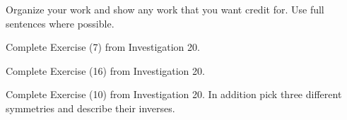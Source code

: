 \documentclass[addpoints]{exam}
\begin{document}
Organize your work and show any work that you want credit for. Use full sentences where possible.

\begin{questions}
\question 
Complete Exercise (7) from Investigation 20.

\question 
Complete Exercise (16) from Investigation 20.

\question 
Complete Exercise (10) from Investigation 20. In addition pick three different symmetries and describe their inverses. 




\end{questions}
\end{document}
